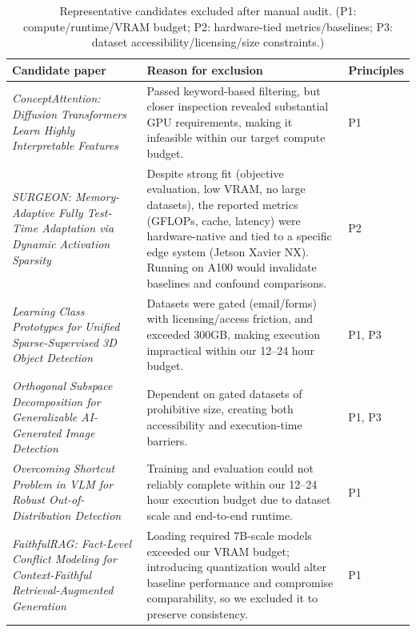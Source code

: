 \documentclass[11pt]{article}
\let\cite\citep
\theoremstyle{plain}
\theoremstyle{definition}
\theoremstyle{remark}
\begin{document}
\begin{table}[H]
\centering
\small
\renewcommand{\arraystretch}{1.25}

{
\begin{tabularx}{\textwidth}{@{}%
  >{\raggedright\arraybackslash}p{}%
  >{\raggedright\arraybackslash}X%
  >{\centering\arraybackslash}p{}@{}}%
\toprule
\rowcolor{white}\textbf{Candidate paper} & \textbf{Reason for exclusion} & \textbf{Principles} \\
\midrule
\emph{ConceptAttention: Diffusion Transformers Learn Highly Interpretable Features} \cite{helbling2025conceptattention} &
Passed keyword-based filtering, but closer inspection revealed substantial GPU requirements, making it infeasible within our target compute budget. &
P1 \\

\emph{SURGEON: Memory-Adaptive Fully Test-Time Adaptation via Dynamic Activation Sparsity} \cite{11094244} &
Despite strong fit (objective evaluation, low VRAM, no large datasets), the reported metrics (GFLOPs, cache, latency) were hardware-native and tied to a specific edge system (Jetson Xavier NX). Running on A100 would invalidate baselines and confound comparisons. &
P2 \\

\emph{Learning Class Prototypes for Unified Sparse-Supervised 3D Object Detection} \cite{Zhu_2025_CVPR} &
Datasets were gated (email/forms) with licensing/access friction, and exceeded 300GB, making execution impractical within our 12--24 hour budget. &
P1, P3 \\

\emph{Orthogonal Subspace Decomposition for Generalizable AI-Generated Image Detection} \cite{yan2025orthogonal} &
Dependent on gated datasets of prohibitive size, creating both accessibility and execution-time barriers. &
P1, P3 \\

\emph{Overcoming Shortcut Problem in VLM for Robust Out-of-Distribution Detection} \cite{11094344} &
Training and evaluation could not reliably complete within our 12--24 hour execution budget due to dataset scale and end-to-end runtime. &
P1 \\

\emph{FaithfulRAG: Fact-Level Conflict Modeling for Context-Faithful Retrieval-Augmented Generation} \cite{zhang-etal-2025-faithfulrag} &
Loading required 7B-scale models exceeded our VRAM budget; introducing quantization would alter baseline performance and compromise comparability, so we excluded it to preserve consistency. &
P1 \\
\bottomrule
\end{tabularx}
}
\caption{Representative candidates excluded after manual audit. (P1: compute/runtime/VRAM budget; P2: hardware-tied metrics/baselines; P3: dataset accessibility/licensing/size constraints.)}
\label{tab:late-stage-exclusions}
\end{table}
\end{document}
